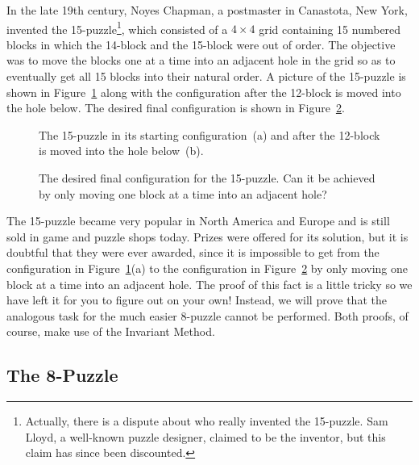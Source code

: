 In the late 19th century, Noyes Chapman, a postmaster in Canastota,
New York, invented the 15-puzzle\footnote{Actually, there is a dispute
about who really invented the 15-puzzle.  Sam Lloyd, a well-known
puzzle designer, claimed to be the inventor, but this claim has since
been discounted.}, which consisted of a $4\times 4$ grid containing 15
numbered blocks in which the 14-block and the 15-block were out of
order.  The objective was to move the blocks one at a time into an
adjacent hole in the grid so as to eventually get all 15 blocks into
their natural order.  A picture of the 15-puzzle is shown in
Figure~\ref{fig:15puzzle} along with the configuration after the
12-block is moved into the hole below.  The desired final
configuration is shown in Figure~\ref{fig:15puzzlesolved}.

\begin{figure}

\qquad\qquad
{}

\caption{The 15-puzzle in its starting configuration~(a) and after the
12-block is moved into the hole below~(b).}

\label{fig:15puzzle}

\end{figure}

\begin{figure}


\caption{The desired final configuration for the 15-puzzle.  Can it be
  achieved by only moving one block at a time into an adjacent hole?}

\label{fig:15puzzlesolved}

\end{figure}

The 15-puzzle became very popular in North America and Europe and is
still sold in game and puzzle shops today.  Prizes were offered for
its solution, but it is doubtful that they were ever awarded, since it
is impossible to get from the configuration in
Figure~\ref{fig:15puzzle}(a) to the configuration in
Figure~\ref{fig:15puzzlesolved} by only moving one block at a time
into an adjacent hole.  The proof of this fact is a little tricky so
we have left it for you to figure out on your own!  Instead, we will
prove that the analogous task for the much easier 8-puzzle cannot be
performed.  Both proofs, of course, make use of the Invariant Method.

\subsection{The 8-Puzzle}

